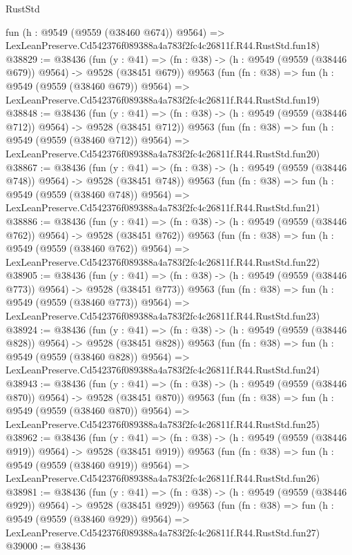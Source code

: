 \begin{lexlean}{RustStd}
\begin{coremodule}
    fun (h : @9549 (@9559 (@38460 @674)) @9564) =>
    LexLeanPreserve.Cd542376f089388a4a783f2fc4c26811f.R44.RustStd.fun18)
@38829 := @38436
    (fun (y : @41) => (fn : @38) -> (h : @9549 (@9559 (@38446 @679)) @9564) -> @9528 (@38451 @679))
    @9563
    (fun (fn : @38) =>
    fun (h : @9549 (@9559 (@38460 @679)) @9564) =>
    LexLeanPreserve.Cd542376f089388a4a783f2fc4c26811f.R44.RustStd.fun19)
@38848 := @38436
    (fun (y : @41) => (fn : @38) -> (h : @9549 (@9559 (@38446 @712)) @9564) -> @9528 (@38451 @712))
    @9563
    (fun (fn : @38) =>
    fun (h : @9549 (@9559 (@38460 @712)) @9564) =>
    LexLeanPreserve.Cd542376f089388a4a783f2fc4c26811f.R44.RustStd.fun20)
@38867 := @38436
    (fun (y : @41) => (fn : @38) -> (h : @9549 (@9559 (@38446 @748)) @9564) -> @9528 (@38451 @748))
    @9563
    (fun (fn : @38) =>
    fun (h : @9549 (@9559 (@38460 @748)) @9564) =>
    LexLeanPreserve.Cd542376f089388a4a783f2fc4c26811f.R44.RustStd.fun21)
@38886 := @38436
    (fun (y : @41) => (fn : @38) -> (h : @9549 (@9559 (@38446 @762)) @9564) -> @9528 (@38451 @762))
    @9563
    (fun (fn : @38) =>
    fun (h : @9549 (@9559 (@38460 @762)) @9564) =>
    LexLeanPreserve.Cd542376f089388a4a783f2fc4c26811f.R44.RustStd.fun22)
@38905 := @38436
    (fun (y : @41) => (fn : @38) -> (h : @9549 (@9559 (@38446 @773)) @9564) -> @9528 (@38451 @773))
    @9563
    (fun (fn : @38) =>
    fun (h : @9549 (@9559 (@38460 @773)) @9564) =>
    LexLeanPreserve.Cd542376f089388a4a783f2fc4c26811f.R44.RustStd.fun23)
@38924 := @38436
    (fun (y : @41) => (fn : @38) -> (h : @9549 (@9559 (@38446 @828)) @9564) -> @9528 (@38451 @828))
    @9563
    (fun (fn : @38) =>
    fun (h : @9549 (@9559 (@38460 @828)) @9564) =>
    LexLeanPreserve.Cd542376f089388a4a783f2fc4c26811f.R44.RustStd.fun24)
@38943 := @38436
    (fun (y : @41) => (fn : @38) -> (h : @9549 (@9559 (@38446 @870)) @9564) -> @9528 (@38451 @870))
    @9563
    (fun (fn : @38) =>
    fun (h : @9549 (@9559 (@38460 @870)) @9564) =>
    LexLeanPreserve.Cd542376f089388a4a783f2fc4c26811f.R44.RustStd.fun25)
@38962 := @38436
    (fun (y : @41) => (fn : @38) -> (h : @9549 (@9559 (@38446 @919)) @9564) -> @9528 (@38451 @919))
    @9563
    (fun (fn : @38) =>
    fun (h : @9549 (@9559 (@38460 @919)) @9564) =>
    LexLeanPreserve.Cd542376f089388a4a783f2fc4c26811f.R44.RustStd.fun26)
@38981 := @38436
    (fun (y : @41) => (fn : @38) -> (h : @9549 (@9559 (@38446 @929)) @9564) -> @9528 (@38451 @929))
    @9563
    (fun (fn : @38) =>
    fun (h : @9549 (@9559 (@38460 @929)) @9564) =>
    LexLeanPreserve.Cd542376f089388a4a783f2fc4c26811f.R44.RustStd.fun27)
@39000 := @38436

\end{coremodule}
\end{lexlean}
